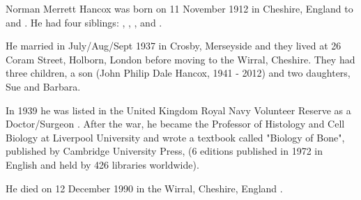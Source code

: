 
Norman Merrett Hancox was born on 11 November 1912 in Cheshire, England to  and . He had four siblings: , , , and .

He married  in July/Aug/Sept 1937 in Crosby, Merseyside \cite{NMHancoxMarriage} and they lived at 26 Coram Street, Holborn, London \cite{NMHancoxResidence} before moving to the Wirral, Cheshire. They had three children, a son (John Philip Dale Hancox, 1941 - 2012) and two daughters, Sue and Barbara.

In 1939 he was listed in the United Kingdom Royal Navy Volunteer Reserve as a  Doctor/Surgeon \cite{NMHancoxWar}.  After the war, he became the Professor of Histology and Cell Biology at Liverpool University and wrote a textbook called "Biology of Bone", published by Cambridge University Press, (6 editions published in 1972 in English and held by 426 libraries worldwide)\cite{NMHancoxBook}.

He died on 12 December 1990 in the	Wirral, Cheshire, England \cite{NMHancoxDeath}.

